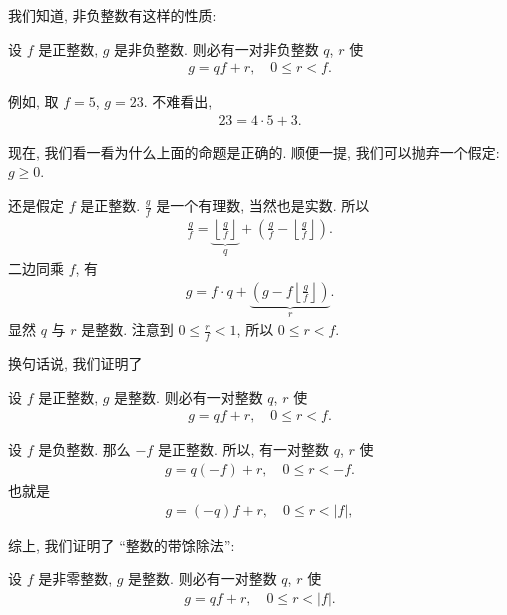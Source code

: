 我们知道, 非负整数有这样的性质:

\begin{proposition}
    设 $f$ 是正整数, $g$ 是非负整数. 则必有一对非负整数 $q$, $r$ 使
    \begin{align*}
        g = qf + r, \quad 0 \leq r < f.
    \end{align*}
\end{proposition}

例如, 取 $f=5$, $g=23$. 不难看出,
\begin{align*}
    23 = 4 \cdot 5 + 3.
\end{align*}

现在, 我们看一看为什么上面的命题是正确的. 顺便一提, 我们可以抛弃一个假定: $g \geq 0$.

还是假定 $f$ 是正整数. $\frac{g}{f}$ 是一个有理数, 当然也是实数. 所以
\begin{align*}
    \frac{g}{f} = \underbrace{\left\lfloor \frac{g}{f} \right\rfloor}_{q} + \left( \frac{g}{f} - \left\lfloor \frac{g}{f} \right\rfloor \right).
\end{align*}
二边同乘 $f$, 有
\begin{align*}
    g = f \cdot q + \underbrace{\left( g - f\left\lfloor \frac{g}{f} \right\rfloor \right)}_{r}.
\end{align*}
显然 $q$ 与 $r$ 是整数. 注意到 $0 \leq \frac{r}{f} < 1$, 所以 $0 \leq r < f$.

换句话说, 我们证明了
\begin{proposition}
    设 $f$ 是正整数, $g$ 是整数. 则必有一对整数 $q$, $r$ 使
    \begin{align*}
        g = qf + r, \quad 0 \leq r < f.
    \end{align*}
\end{proposition}

设 $f$ 是负整数. 那么 $-f$ 是正整数. 所以, 有一对整数 $q$, $r$ 使
\begin{align*}
    g = q(-f) + r, \quad 0 \leq r < -f.
\end{align*}
也就是
\begin{align*}
    g = (-q)f + r, \quad 0 \leq r < |f|,
\end{align*}

综上, 我们证明了 ``整数的带馀除法'':
\begin{proposition}
    设 $f$ 是非零整数, $g$ 是整数. 则必有一对整数 $q$, $r$ 使
    \begin{align*}
        g = qf + r, \quad 0 \leq r < |f|.
    \end{align*}
\end{proposition}

